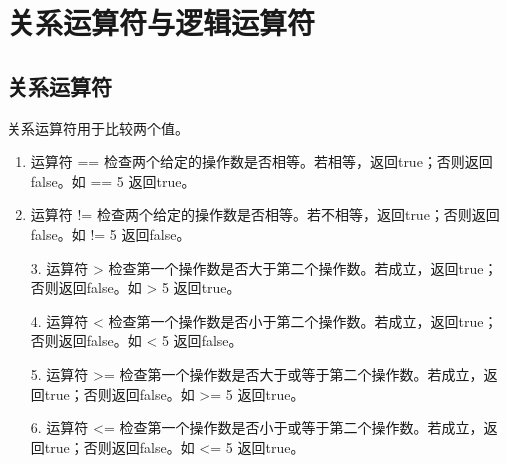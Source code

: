 \section{关系运算符与逻辑运算符}

\subsection{关系运算符}

\begin{frame}\ft{\subsecname}
关系运算符用于比较两个值。
\begin{enumerate}
\item
  运算符 {\tf ==}  检查两个给定的操作数是否相等。若相等，返回{\tf true}；否则返回{\tf false}。如 { == 5} 返回{\tf true}。
\item
  运算符 {\tf !=}  检查两个给定的操作数是否相等。若不相等，返回{\tf true}；否则返回{\tf false}。如 { != 5} 返回{\tf false}。
\end{enumerate}
\end{frame}

\begin{frame}\ft{\subsecname}
  \begin{enumerate}
\item[3.]
  运算符 {\tf >} 检查第一个操作数是否大于第二个操作数。若成立，返回{\tf true}；否则返回{\tf false}。如 { > 5} 返回{\tf true}。
\item[4.]
  运算符 {\tf <} 检查第一个操作数是否小于第二个操作数。若成立，返回{\tf true}；否则返回{\tf false}。如 { < 5} 返回{\tf false}。
\end{enumerate}
\end{frame}

\begin{frame}\ft{\subsecname}
  \begin{enumerate}
\item[5.]
  运算符 {\tf >=} 检查第一个操作数是否大于或等于第二个操作数。若成立，返回{\tf true}；否则返回{\tf false}。如 { >= 5} 返回{\tf true}。
\item[6.]
  运算符 {\tf <=} 检查第一个操作数是否小于或等于第二个操作数。若成立，返回{\tf true}；否则返回{\tf false}。如 { <= 5} 返回{\tf true}。
\end{enumerate}
  
\end{frame}

\begin{frame}\ft{\subsecname}

  
\end{frame}


